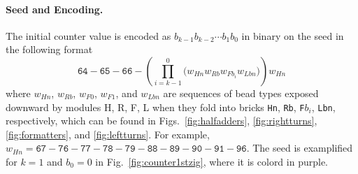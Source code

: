 \documentclass[twocolumn]{svjour3}
\begin{document}
\paragraph{Seed and Encoding.}
The initial counter value is encoded as $b_{k-1}b_{k-2} \cdots b_1b_0$ in binary on the seed in the following format
\begin{equation} \label{eq:zagencoding}
\texttt{64}{-}\texttt{65}{-}\texttt{66}{-}\left( \prod^0_{i = k-1} \bigl(  w_{Hn} w_{Rb} w_{Fb_i} w_{Lbn} \bigr) \right) w_{Hn}
\end{equation}
where 
$w_{Hn}$, $w_{Rb}$, $w_{F0}$, $w_{F1}$, and $w_{Lbn}$ are sequences of bead types exposed downward by modules H, R, F, L when they fold into bricks \texttt{Hn}, \texttt{Rb}, \texttt{F}$b_i$, \texttt{Lbn}, respectively, which can be found in Figs.~\ref{fig:halfadders}, \ref{fig:rightturns}, \ref{fig:formatters}, and \ref{fig:leftturns}.
For example, $w_{Hn} = \texttt{67}{-}\texttt{76}{-}\texttt{77}{-}\texttt{78}{-}\texttt{79}{-}\texttt{88}{-}\texttt{89}{-}\texttt{90}{-}\texttt{91}{-}\texttt{96}$.
The seed is examplified for $k = 1$ and $b_0 = 0$ in Fig.~\ref{fig:counter1stzig}, where it is colord in purple.
\end{document}
